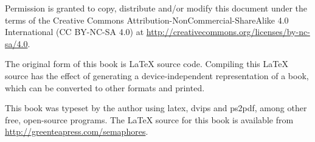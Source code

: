Permission is granted to copy, distribute and/or modify this
document under the terms of the Creative Commons
Attribution-NonCommercial-ShareAlike 4.0 International (CC BY-NC-SA 4.0)
at \url{http://creativecommons.org/licenses/by-nc-sa/4.0}.

The original form of this book is LaTeX source code.
Compiling this LaTeX source has the effect of generating
a device-independent representation of a book, which
can be converted to other formats and printed.

This book was typeset by the author using latex, dvips and ps2pdf,
among other free, open-source programs.
The LaTeX source for this book is available from
\url{http://greenteapress.com/semaphores}.


